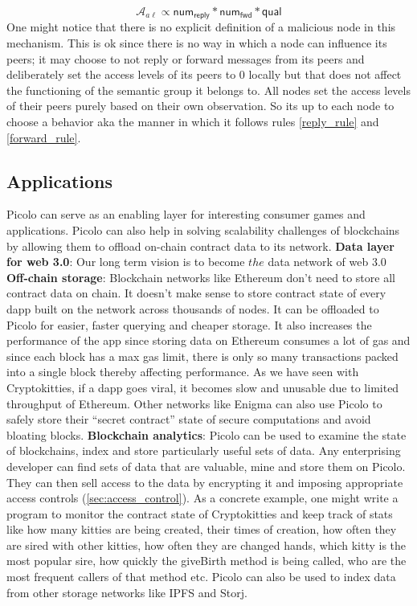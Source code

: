 \newline
$$ \mathcal{A}_{a\ell} \propto \textsf{num}_\textsf{reply} * \textsf{num}_\textsf{fwd} * \textsf{qual}$$
One might notice that there is no explicit definition of a malicious node in this mechanism. This is ok since there is no way in which a node can influence its peers; it may choose to not reply or forward messages from its peers and deliberately set the access levels of its peers to 0 locally but that does not affect the functioning of the semantic group it belongs to. All nodes set the access levels of their peers purely based on their own observation. So its up to each node to choose a behavior aka the manner in which it follows rules \ref{reply_rule} and \ref{forward_rule}.

\subsection{Applications}
\textsf{Picolo} can serve as an enabling layer for interesting consumer games and applications. \textsf{Picolo} can also help in solving scalability challenges of blockchains by allowing them to offload on-chain contract data to its network. 
\newline\newline
\textbf{Data layer for web 3.0}: Our long term vision is to become $the$ data network of web 3.0 
\newline\newline
\textbf{Off-chain storage}: Blockchain networks like Ethereum don't need to store all contract data on chain. It doesn't make sense to store contract state of every dapp built on the network across thousands of nodes. It can be offloaded to \textsf{Picolo} for easier, faster querying and cheaper storage. It also increases the performance of the app since storing data on Ethereum consumes a lot of gas and since each block has a max gas limit, there is only so many transactions packed into a single block thereby affecting performance. As we have seen with Cryptokitties, if a dapp goes viral, it becomes slow and unusable due to limited throughput of Ethereum. Other networks like Enigma \cite{enigma} can also use \textsf{Picolo} to safely store their ``secret contract'' state of secure computations and avoid bloating blocks.
\newline\newline
\textbf{Blockchain analytics}: \textsf{Picolo} can be used to examine the state of blockchains, index and store particularly useful sets of data. Any enterprising developer can find sets of data that are valuable, mine and store them on \textsf{Picolo}. They can then sell access to the data by encrypting it and imposing appropriate access controls (\cref{sec:access_control}). As a concrete example, one might write a program to monitor the contract state of Cryptokitties and keep track of stats like how many kitties are being created, their times of creation, how often they are sired with other kitties, how often they are changed hands, which kitty is the most popular sire, how quickly the \textsf{giveBirth} method is being called, who are the most frequent callers of that method etc. \textsf{Picolo} can also be used to index data from other storage networks like IPFS and Storj. 


